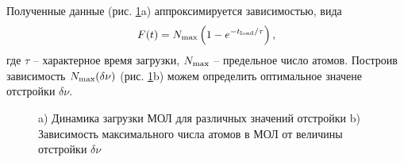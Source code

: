 
Полученные данные (рис. \ref{fig:motload}a) аппроксимируется зависимостью, вида
\begin{equation}
	F(t) = N_{\textnormal{max}} \left(1- e^{-t_{\textnormal{load}}/\tau}\right),
\end{equation}
где $\tau$ -- характерное время загрузки, $N_{\textnormal{max}}$ -- предельное число атомов.  Построив зависимость $N_{\textnormal{max}} (\delta \nu)$ (рис. \ref{fig:motload}b) можем определить оптимальное значене отстройки $\delta \nu$. 

\begin{figure}[h]
    \centering
    \hspace{15 mm} 
    \caption{a) Динамика загрузки МОЛ для различных значений отстройки b)  Зависимость максимального числа атомов в МОЛ от величины отстройки $\delta \nu$}
    \label{fig:motload}
\end{figure}



